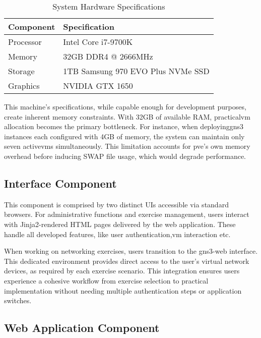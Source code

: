         \begin{table}[h]
            \centering
            \caption{System Hardware Specifications}
            \begin{tabular}{|l|l|}
                \hline
                \textbf{Component} & \textbf{Specification} \\ \hline
                Processor & Intel Core i7-9700K \\ \hline
                Memory & 32GB DDR4 @ 2666MHz \\ \hline
                Storage & 1TB Samsung 970 EVO Plus NVMe SSD \\ \hline
                Graphics & NVIDIA GTX 1650 \\ \hline
            \end{tabular}
        \end{table}

        This machine's specifications, while capable enough for development purposes, create inherent memory constraints. With 32GB of available RAM, 
        practical\ac{vm} allocation becomes the primary bottleneck. For instance, when deploying\ac{gns3} instances each configured with 4GB of memory, 
        the system can maintain only seven active\ac{vm}s simultaneously. This limitation accounts for \ac{pve}'s own memory overhead 
        before inducing SWAP file usage, which would degrade performance.

    \subsection{Interface Component}
        This component is comprised by two distinct UIs accessible via standard browsers. For administrative functions and exercise management, 
        users interact with Jinja2-rendered HTML pages delivered by the web application. These handle all developed features, like user 
        authentication,\ac{vm} interaction etc.

        When working on networking exercises, users transition to the \ac{gns3}-web interface. This dedicated environment 
        provides direct access to the user's virtual network devices, as required by each exercise scenario. This integration ensures users experience 
        a cohesive workflow from exercise selection to practical implementation without needing multiple authentication steps or application switches.

    \subsection{Web Application Component}

